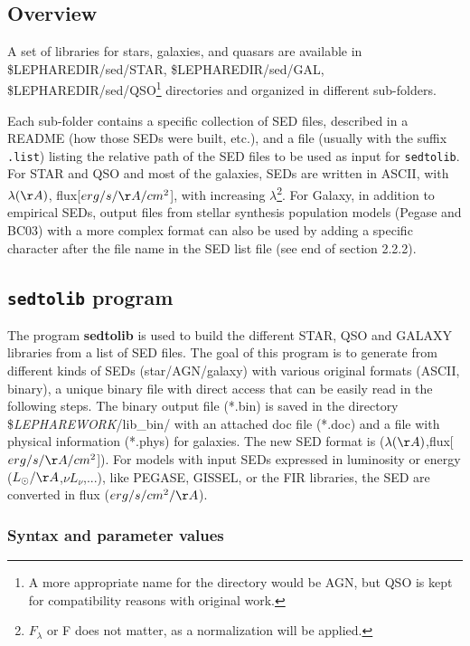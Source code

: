 \documentclass[12pt]{article}
\begin{document}
\subsection{Overview}

A set of libraries for stars, galaxies, and quasars are available in \$LEPHAREDIR/sed/STAR, \$LEPHAREDIR/sed/GAL, \$LEPHAREDIR/sed/QSO\footnote{A more appropriate name for the directory would be AGN, but QSO is kept for compatibility reasons with original work.} directories and organized in different sub-folders.
  
Each sub-folder contains a specific collection of SED files, described in a README (how those SEDs were built, etc.), and a file (usually with the suffix \texttt{.list}) listing the relative path of the SED files to be used as input for \texttt{sedtolib}.  
For STAR and QSO and most of the galaxies, SEDs are written in  ASCII, with  $\lambda(\AA)$, flux[$erg/s/\AA/cm^2$], with increasing $\lambda$\footnote{$F_\lambda$ or F does not matter, as a normalization will be applied.}.
For Galaxy, in addition to empirical SEDs, output files from stellar synthesis population models (Pegase and BC03) with a more complex format can also be used by adding a specific character after the file name in the SED list file (see end of section 2.2.2). 
% 
%
\subsection{ \texttt{sedtolib} program }
  The program {\bf sedtolib} is used to build the different STAR, QSO 
   and GALAXY libraries from a list of SED files.
%
  The goal of this program is to generate from different kinds of SEDs (star/AGN/galaxy)
   with various original formats (ASCII, binary), a unique binary file with direct access
    that can be easily read in the following steps.
   The binary output file (*.bin) is saved in the directory \${\it LEPHAREWORK}/lib\_bin/ 
   with an attached doc file (*.doc) and a file with physical information (*.phys) for galaxies.
   The new SED format is ($\lambda(\AA)$,flux[$erg/s/\AA/cm^2$]).   
    For models with input SEDs expressed in  luminosity or energy ($L_{\odot}/\AA$,$\nu L_{\nu}$,...),
    like PEGASE, GISSEL, or the FIR libraries, the SED are converted in flux ($erg/s/cm^2/\AA$). 

\subsubsection{Syntax and parameter values}
 
\end{document}
